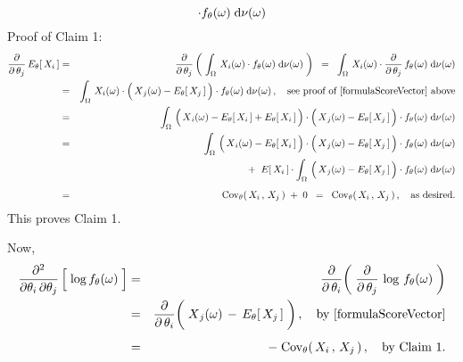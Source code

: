 \begin{enumerate}
\begin{equation*}
			\cdot
			f_{\theta}(\omega)
		\;\textnormal{d}\nu(\omega)
	\end{equation*}
	Proof of Claim 1:\quad
	\begin{eqnarray*}
	\dfrac{\partial}{\partial\,\theta_{j}}\,E_{\theta}\!\left[\,X_{i}\,\right]
	& = &
		\dfrac{\partial}{\partial\,\theta_{j}}
		\left(\;
			\int_{\Omega}\,
			X_{i}(\omega) \cdot f_{\theta}(\omega)
			\;\d\nu(\omega)
		\;\right)
	\;\; = \;\;
		\int_{\Omega}\,
			X_{i}(\omega) \cdot
			\dfrac{\partial}{\partial\,\theta_{j}}\,f_{\theta}(\omega)
		\;\d\nu(\omega)
	\\
	& = &
		\int_{\Omega}\,
			X_{i}(\omega) \cdot
			\left(\,\overset{{\color{white}.}}{X}_{j}(\omega) - E_{\theta}\!\left[\,X_{j}\,\right]\,\right)
			\cdot
			f_{\theta}(\omega)
		\;\d\nu(\omega)\,,
		\quad
		\textnormal{see proof of \eqref{formulaScoreVector} above}
	\\
	& = &
		\int_{\Omega}\,
			\left(\,\overset{{\color{white}.}}{X}_{i}(\omega) - E_{\theta}\!\left[\,X_{i}\,\right] + E_{\theta}\!\left[\,X_{i}\,\right]\,\right)
			\cdot
			\left(\,\overset{{\color{white}.}}{X}_{j}(\omega) - E_{\theta}\!\left[\,X_{j}\,\right]\,\right)
			\cdot
			f_{\theta}(\omega)
		\;\d\nu(\omega)
	\\
	& = &
		{\color{white}+}\;
		\int_{\Omega}\,
			\left(\,\overset{{\color{white}.}}{X}_{i}(\omega) - E_{\theta}\!\left[\,X_{i}\,\right]\,\right)
			\cdot
			\left(\,\overset{{\color{white}.}}{X}_{j}(\omega) - E_{\theta}\!\left[\,X_{j}\,\right]\,\right)
			\cdot
			f_{\theta}(\omega)
		\;\d\nu(\omega)
	\\
	&&
		+\;\;
		E\!\left[\,X_{i}\,\right]
		\cdot
		\int_{\Omega}\,
			\left(\,\overset{{\color{white}.}}{X}_{j}(\omega) - E_{\theta}\!\left[\,X_{j}\,\right]\,\right)
			\cdot
			f_{\theta}(\omega)
		\;\d\nu(\omega)
	\\
	& \overset{{\color{white}\vert}}{=} &
		\Cov_{\theta}\!\left(\,X_{i}\,,\,X_{j}\,\right) \; + \; 0
	\;\; = \;\;
		\Cov_{\theta}\!\left(\,X_{i}\,,\,X_{j}\,\right),
		\quad
		\textnormal{as desired}.
	\end{eqnarray*}
	This proves Claim 1.
	
	\vskip 0.5cm
	\noindent
	Now,
	\begin{eqnarray*}
	\dfrac{\partial^{2}}{\partial\theta_{i}\,\partial\theta_{j}} \left[\;\overset{{\color{white}.}}{\log} \, f_{\theta}(\omega)\;\right]
	&=&
		\dfrac{\partial}{\partial\,\theta_{i}}\!
		\left(\;
			\dfrac{\partial}{\partial\,\theta_{j}}\, \log \, f_{\theta}(\omega)
		\;\right)
	\\
	&=&
		\dfrac{\partial}{\partial\,\theta_{i}}\!
		\left(\;
			\overset{{\color{white}-}}{X}_{j}(\omega) \, - \, E_{\theta}\!\left[\,X_{j}\,\right]
		\;\right),
		\quad
		\textnormal{by \eqref{formulaScoreVector}}
	\\
	&\overset{{\color{white}\vert}}{=}&
		-\; \Cov_{\theta}\!\left(\,X_{i}\,,\,X_{j}\,\right),
		\quad
		\textnormal{by Claim 1}.
	\end{eqnarray*}
	

\end{enumerate}
